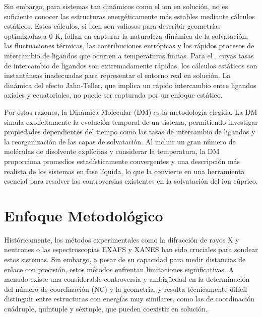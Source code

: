 Sin embargo, para sistemas tan dinámicos como el ion  en solución, no es suficiente conocer las estructuras energéticamente más estables mediante cálculos estáticos. Estos cálculos, si bien son valiosos para describir geometrías optimizadas a 0 K, fallan en capturar la naturaleza dinámica de la solvatación, las fluctuaciones térmicas, las contribuciones entrópicas y los rápidos procesos de intercambio de ligandos que ocurren a temperaturas finitas. Para el , cuyas tasas de intercambio de ligandos son extremadamente rápidas, los cálculos estáticos son instantáneas inadecuadas para representar el entorno real en solución. La dinámica del efecto Jahn-Teller, que implica un rápido intercambio entre ligandos axiales y ecuatoriales, no puede ser capturada por un enfoque estático.

Por estas razones, la Dinámica Molecular (DM) es la metodología elegida. La DM simula explícitamente la evolución temporal de un sistema, permitiendo investigar propiedades dependientes del tiempo como las tasas de intercambio de ligandos y la reorganización de las capas de solvatación. Al incluir un gran número de moléculas de disolvente explícitas y considerar la temperatura, la DM proporciona promedios estadísticamente convergentes y una descripción más realista de los sistemas en fase líquida, lo que la convierte en una herramienta esencial para resolver las controversias existentes en la solvatación del ion cúprico.
    
\section{Enfoque Metodológico}

Históricamente, los métodos experimentales como la difracción de rayos X y neutrones o las espectroscopias EXAFS y XANES han sido cruciales para sondear estos sistemas. Sin embargo, a pesar de su capacidad para medir distancias de enlace con precisión, estos métodos enfrentan limitaciones significativas. A menudo existe una considerable controversia y ambigüedad en la determinación del número de coordinación (NC) y la geometría, y resulta técnicamente difícil distinguir entre estructuras con energías muy similares, como las de coordinación cuádruple, quíntuple y séxtuple, que pueden coexistir en solución.

